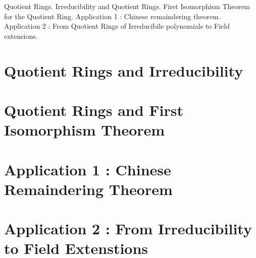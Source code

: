 
\noindent
Quotient Rings. Irreducibility and Quotient Rings. First Isomorphism Theorem for the Quotient Ring.
Application 1 : Chinese remaindering theorem.
Application 2 : From Quotient Rings of Irreducibile polynomials to Field extensions.

\section{Quotient Rings and Irreducibility}

\section{Quotient Rings and First Isomorphism Theorem}

\section{Application 1 : Chinese Remaindering Theorem}

\section{Application 2 : From Irreducibility to Field Extenstions}
